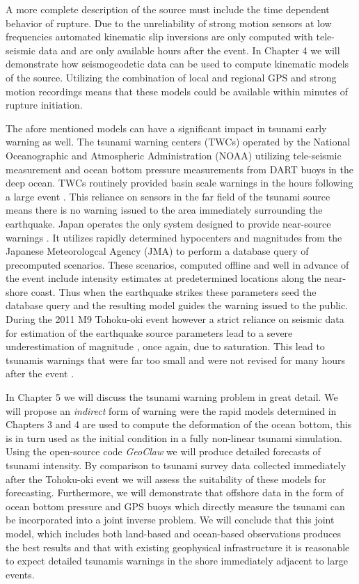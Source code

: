 A more complete description of the source must include the time dependent behavior of rupture. Due to the unreliability of strong motion sensors at low frequencies automated kinematic slip inversions are only computed with tele-seismic data \citep{ji2002} and are only available hours after the event. In Chapter 4 we will demonstrate how seismogeodetic data can be used to compute kinematic models of the source. Utilizing the combination of local and regional GPS and strong motion recordings means that these models could be available within minutes of rupture initiation.

The afore mentioned models can have a significant impact in tsunami early warning as well. The tsunami warning centers (TWCs) operated by the National Oceanographic and Atmospheric Administration (NOAA) utilizing tele-seismic measurement and ocean bottom pressure measurements from DART buoys in the deep ocean. TWCs routinely provided basin scale warnings in the hours following a large event \citep{gonzalez2005,titov2005,mungov2013}. This reliance on sensors in the far field of the tsunami source means there is no warning issued to the area immediately surrounding the earthquake. Japan operates the only system designed to provide near-source warnings \citep{tatehata1997,ozaki2011}. It utilizes rapidly determined hypocenters and magnitudes from the Japanese Meteorologcal Agency (JMA) to perform a database query of precomputed scenarios. These scenarios, computed offline and well in advance of the event include intensity estimates at predetermined locations along the near-shore coast. Thus when the earthquake strikes these parameters seed the database query and the resulting model guides the warning issued to the public. During the 2011 M9 Tohoku-oki event however a strict reliance on seismic data for estimation of the earthquake source parameters lead to a severe underestimation of magnitude \citep{hoshiba2011}, once again, due to saturation. This lead to tsunamis warnings that were far too small and were not revised for many hours after the event \citep{ozaki2011}.

In Chapter 5 we will discuss the tsunami warning problem in great detail. We will propose an \textit{indirect} form of warning were the rapid models determined in Chapters 3 and 4 are used to compute the deformation of the ocean bottom, this is in turn used as the initial condition in a  fully non-linear tsunami simulation. Using the open-source code \textit{GeoClaw} \citep{leveque2011} we will produce detailed forecasts of tsunami intensity. By comparison to tsunami survey data collected immediately after the Tohoku-oki event \citep{mori2011,mori2012} we will assess the suitability of these models for forecasting. Furthermore, we will demonstrate that offshore data in the form of ocean bottom pressure and GPS buoys which directly measure the tsunami can be incorporated into a joint inverse problem. We will conclude that this joint model, which includes both land-based and ocean-based observations produces the best results and that with existing geophysical infrastructure it is reasonable to expect detailed tsunamis warnings in the shore immediately adjacent to large events.



